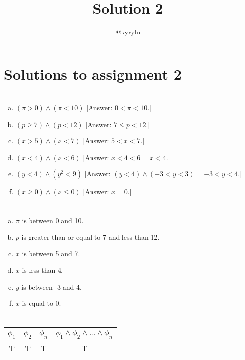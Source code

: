 \documentclass{article}
\title{Solution 2}
\author{@kyrylo}
\begin{document}
\section*{Solutions to assignment 2}

\section{}

\begin{enumerate}[(a)]
\item $(\pi > 0) \wedge (\pi < 10)$ [Answer: $0 < \pi < 10$.]
\item $(p \geq 7) \wedge (p < 12)$ [Answer: $7 \leq p < 12$.]
\item $(x > 5) \wedge (x < 7)$ [Answer: $5 < x < 7$.]
\item $(x < 4) \wedge (x < 6)$ [Answer: $x < 4 < 6 = x < 4$.]
\item $(y < 4) \wedge (y^2 < 9)$ [Answer: $(y < 4) \wedge (-3 < y < 3) = -3 < y < 4$.]
\item $(x \geq 0) \wedge (x \leq 0)$ [Answer: $x = 0$.]
\end{enumerate}

\section{}

\begin{enumerate}[(a)]
\item $\pi$ is between 0 and 10.
\item $p$ is greater than or equal to 7 and less than 12.
\item $x$ is between 5 and 7.
\item $x$ is less than 4.
\item $y$ is between -3 and 4.
\item $x$ is equal to 0.
\end{enumerate}

\section{}

\begin{tabular}{ | c | c | c | c | }
  \hline
  $\phi_1$ & $\phi_2$ & $\phi_n$ & $\phi_1 \wedge \phi_2 \wedge \dots \wedge \phi_n$ \\
  \hline
  T & T & T & T \\
  \hline
\end{tabular}
\end{document}

